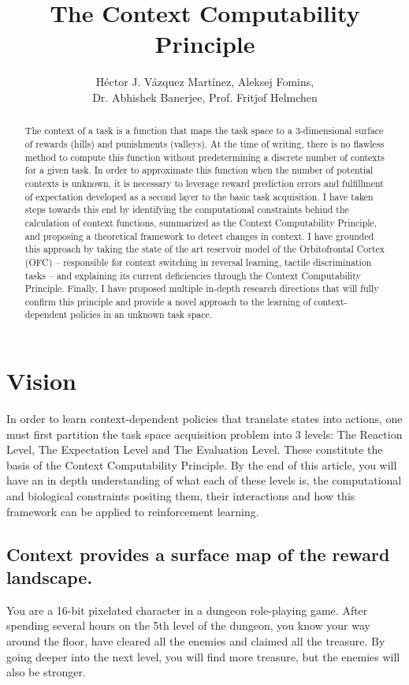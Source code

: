 \documentclass[]{article}
\title{The Context Computability Principle}
\author{H\'ector J. V\'azquez Mart\'inez, Aleksej Fomins,\\
	 Dr. Abhishek Banerjee, Prof. Fritjof Helmchen}
\begin{document}
\maketitle

\begin{abstract}
The context of a task is a function that maps the task space to a 3-dimensional surface of rewards (hills) and punishments (valleys).  At the time of writing, there is no flawless method to compute this function without predetermining a discrete number of contexts for a given task.  In order to approximate this function when the number of potential contexts is unknown, it is necessary to leverage reward prediction errors and fulfillment of expectation developed as a second layer to the basic task acquisition.  I have taken steps towards this end by identifying the computational constraints behind the calculation of context functions, summarized as the Context Computability Principle, and proposing a theoretical framework to detect changes in context.  I have grounded this approach by taking the state of the art reservoir model of the Orbitofrontal Cortex (OFC) -- responsible for context switching in reversal learning, tactile discrimination tasks -- and explaining its current deficiencies through the Context Computability Principle.  Finally, I have proposed multiple in-depth research directions that will fully confirm this principle and provide a novel approach to the learning of context-dependent policies in an unknown task space.
\end{abstract}


\section{Vision}
In order to learn context-dependent policies that translate states into actions, one must first partition the task space acquisition problem into 3 levels: The Reaction Level, The Expectation Level and The Evaluation Level.  These constitute the basis of the Context Computability Principle.  By the end of this article, you will have an in depth understanding of what each of these levels is, the computational and biological constraints positing them, their interactions and how this framework can be applied to reinforcement learning.

\subsection{Context provides a surface map of the reward landscape.}
You are a 16-bit pixelated character in a dungeon role-playing game.  After spending several hours on the 5th level of the dungeon, you know your way around the floor, have cleared all the enemies and claimed all the treasure.  By going deeper into the next level, you will find more treasure, but the enemies will also be stronger.
\end{document}
